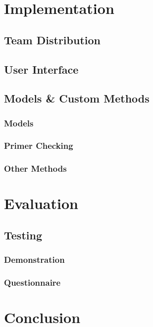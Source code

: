 \documentclass{l3proj}
\begin{document}
\chapter{Implementation}
\label{impl}

\section{Team Distribution}
\label{impl:teamdistribution}


\section{User Interface}
\label{impl:ui}


\section{Models \& Custom Methods}
\label{impl:models}

\subsection{Models}


\subsection{Primer Checking}


\subsection{Other Methods}

\chapter{Evaluation}
\label{eval}

\section{Testing}
\label{eval:testing}

\subsection{Demonstration}
\label{eval:demo}

\subsection{Questionnaire}
\label{eval:question}

\chapter{Conclusion}
\label{conc}

\clearpage


\end{document}
